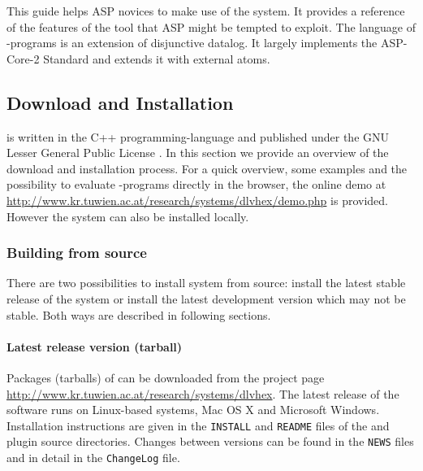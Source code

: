 \documentclass[14pt,a4paper, titlepage]{article}
\begin{document}
This guide helps ASP novices to make use of the system. It provides a reference of the features of the tool that ASP might be tempted to exploit. The language of \hex{}-programs is an extension of disjunctive datalog. It largely implements the ASP-Core-2 Standard \cite{ref} and extends it with external atoms. 


\subsection{Download and Installation}
\dlvhex{} is written in the C++ programming-language and published under the GNU Lesser General Public License \cite{licnc}. In this section we provide an overview of the download and installation process. For a quick overview, some examples and the possibility to evaluate \hex{}-programs directly in the browser, the online demo at \url{http://www.kr.tuwien.ac.at/research/systems/dlvhex/demo.php} is provided. However the system can also be installed locally. 

\subsubsection{Building from source}
There are two possibilities to install \dlvhex{} system from source: install the latest stable release of the system or install the latest development version which may not be stable. Both ways are described in following sections.  

\paragraph{Latest release version (tarball)}
Packages (tarballs) of \dlvhex{} can be downloaded from the project page \url{http://www.kr.tuwien.ac.at/research/systems/dlvhex}. The latest release of the software runs on Linux-based systems, Mac OS X and Microsoft Windows. Installation instructions are given in the {\tt INSTALL} and {\tt README} files of the \dlvhex{} and plugin source directories. Changes between versions can be found in the {\tt NEWS} files and in detail in the {\tt ChangeLog} file. 
\end{document}
